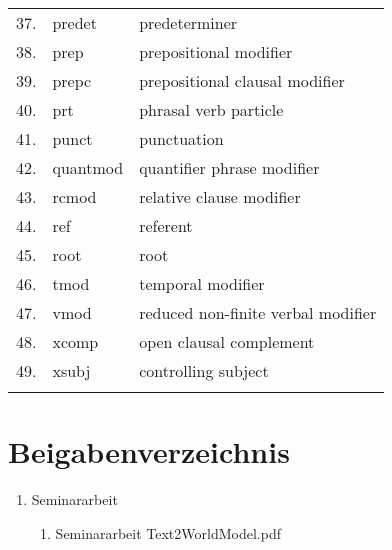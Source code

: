 \begin{longtable}{|l|l|l|}
37. & predet & predeterminer\\
38. & prep & prepositional modifier\\
39. & prepc & prepositional clausal modifier\\
40. & prt & phrasal verb particle\\
41. & punct & punctuation\\
42. & quantmod & quantifier phrase modifier\\
43. & rcmod & relative clause modifier\\
44. & ref & referent\\
45. & root & root\\
46. & tmod & temporal modifier\\
47. & vmod & reduced non-finite verbal modifier\\
48. & xcomp & open clausal complement\\
49. & xsubj & controlling subject\\
\label{table:DEPTAGS}
\end{longtable}

\section{Beigabenverzeichnis}
\begin{enumerate}
	\item Seminararbeit
	\begin{enumerate}
		\item Seminararbeit Text2WorldModel.pdf
	\end{enumerate}

\end{enumerate} 

